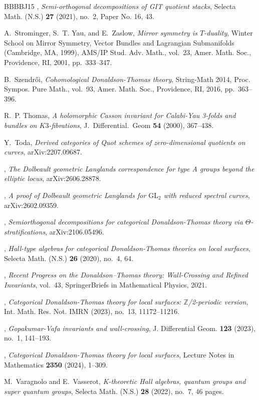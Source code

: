 \documentclass [11pt,oneside,a4paper,mathscr]{amsart}
\theoremstyle{definition}
\begin{document}
\begin{thebibliography}{BBBBJ15}
\bysame, \emph{Semi-orthogonal decompositions of {GIT} quotient stacks}, Selecta Math. (N.S.) \textbf{27} (2021), no.~2, Paper No. 16, 43.

A.~Strominger, S.~T. Yau, and E.~Zaslow, \emph{Mirror symmetry is {$T$}-duality}, Winter {S}chool on {M}irror {S}ymmetry, {V}ector {B}undles and {L}agrangian {S}ubmanifolds ({C}ambridge, {MA}, 1999), AMS/IP Stud. Adv. Math., vol.~23, Amer. Math. Soc., Providence, RI, 2001, pp.~333--347.

B.~Szendrői, \emph{Cohomological {D}onaldson-{T}homas theory}, String-{M}ath 2014, Proc. Sympos. Pure Math., vol.~93, Amer. Math. Soc., Providence, RI, 2016, pp.~363--396.

R.~P. Thomas, \emph{A holomorphic {C}asson invariant for {C}alabi-{Y}au 3-folds and bundles on ${K3}$-fibrations}, J.~Differential.~Geom \textbf{54} (2000), 367--438.

Y.~Toda, \emph{Derived categories of {Q}uot schemes of zero-dimensional quotients on curves}, arXiv:2207.09687.

\bysame, \emph{The {D}olbeault geometric {L}anglands correspondence for type {A} groups beyond the elliptic locus}, arXiv:2606.28878.

\bysame, \emph{A proof of {D}olbeault geometric {L}anglands for $\mathrm{GL}_2$ with reduced spectral curves}, arXiv:2602.09359.

\bysame, \emph{Semiorthogonal decompositions for categorical {D}onaldson-{T}homas theory via {$\Theta$}-stratifications}, arXiv:2106.05496.

\bysame, \emph{Hall-type algebras for categorical {D}onaldson-{T}homas theories on local surfaces}, Selecta Math. (N.S.) \textbf{26} (2020), no.~4, 64.

\bysame, \emph{Recent {P}rogress on the {D}onaldson–{T}homas theory: {W}all-{C}rossing and {R}efined {I}nvariants}, vol.~43, SpringerBriefs in Mathematical Physics, 2021.

\bysame, \emph{Categorical {D}onaldson-{T}homas theory for local surfaces: {$\mathbb{Z}$}/2-periodic version}, Int. Math. Res. Not. IMRN (2023), no.~13, 11172--11216.

\bysame, \emph{Gopakumar-{V}afa invariants and wall-crossing}, J. Differential Geom. \textbf{123} (2023), no.~1, 141--193.

\bysame, \emph{Categorical {D}onaldson-{T}homas theory for local surfaces}, Lecture Notes in Mathematics \textbf{2350} (2024), 1--309.

M.~Varagnolo and E.~Vasserot, \emph{K-theoretic {H}all algebras, quantum groups and super quantum groups}, Selecta Math. (N.S.) \textbf{28} (2022), no.~7, 46 pages.

\end{thebibliography}
\end{document}
